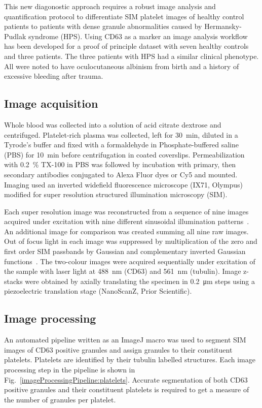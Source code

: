 This new diagonostic approach requires a robust image analysis and quantification protocol to differentiate SIM platelet images of healthy control patients to patients with dense granule abnormalities caused by Hermansky-Pudlak syndrome (HPS). Using CD63 as a marker an image analysis workflow has been developed for a proof of principle dataset with seven healthy controls and three patients. The three patients with HPS had a similar clinical phenotype. All were noted to have oculocutaneous albinism from birth and a history of excessive bleeding after trauma.

\subsection{Image acquisition}
Whole blood was collected into a solution of acid citrate dextrose and centrifuged. Platelet-rich plasma was collected, left for \SI{30}{\minute}, diluted in a Tyrode’s buffer and fixed with a formaldehyde in Phosphate-buffered saline (PBS) for \SI{10}{\minute} before  centrifugation in coated coverslips. Permeabilization with \SI{0.2}{\percent} TX-100 in PBS was followed by incubation with primary, then secondary antibodies conjugated to Alexa Fluor dyes or Cy5 and mounted. Imaging used an inverted widefield fluorescence microscope (IX71, Olympus) modified for super resolution structured illumination microscopy (SIM). 

Each super resolution image was reconstructed from a sequence of nine images acquired under excitation with nine different sinusoidal illumination patterns~\cite{Gustafsson2008}. An additional image for comparison was created summing all nine raw images. Out of focus light in each image was suppressed by multiplication of the zero and first order SIM passbands by Gaussian and complementary inverted Gaussian functions~\cite{Holleran2014}. The two-colour images were acquired sequentially under excitation of the sample with laser light at \SI{488}{\nano\meter} (CD63) and \SI{561}{\nano\meter} (tubulin). Image z-stacks were obtained by axially translating the specimen in \SI{0.2}{\micro\meter} steps using a piezoelectric translation stage (NanoScanZ, Prior Scientific).

\subsection{Image processing}
An automated pipeline written as an ImageJ macro was used to segment SIM images of CD63 positive granules and assign granules to their constituent platelets. Platelets are identified by their tubulin labelled structures. Each image processing step in the pipeline is shown in Fig.~\ref{imageProcessingPipeline:platelets}. Accurate segmentation of both CD63 positive granules and their constituent platelets is required to get a measure of the number of granules per platelet.

